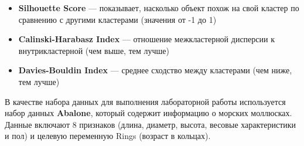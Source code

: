 \begin{itemize}
    \item \textbf{Silhouette Score} — показывает, насколько объект похож на свой кластер по сравнению с другими кластерами (значения от -1 до 1)
    \item \textbf{Calinski-Harabasz Index} — отношение межкластерной дисперсии к внутрикластерной (чем выше, тем лучше)
    \item \textbf{Davies-Bouldin Index} — среднее сходство между кластерами (чем ниже, тем лучше)
\end{itemize}

В качестве набора данных для выполнения лабораторной работы используется набор данных \textbf{Abalone}, который содержит информацию о морских моллюсках. Данные включают 8 признаков (длина, диаметр, высота, весовые характеристики и пол) и целевую переменную Rings (возраст в кольцах).

\endinput